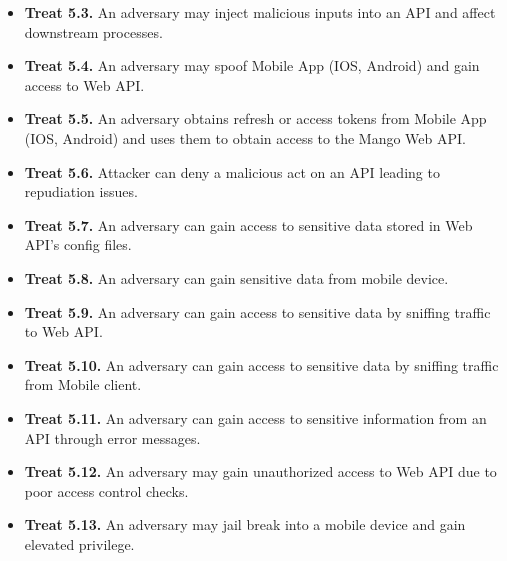 \begin{enumerate}
\begin{itemize}
        \item \textbf{Treat 5.3.} An adversary may inject malicious inputs into an API and affect downstream processes.
        \item \textbf{Treat 5.4.} An adversary may spoof Mobile App (IOS, Android) and gain access to Web API\@.
        \item \textbf{Treat 5.5.} An adversary obtains refresh or access tokens from Mobile App (IOS, Android) and uses them to
        obtain access to the Mango Web API\@.
        \item \textbf{Treat 5.6.} Attacker can deny a malicious act on an API leading to repudiation issues.
        \item \textbf{Treat 5.7.} An adversary can gain access to sensitive data stored in Web API's config files.
        \item \textbf{Treat 5.8.} An adversary can gain sensitive data from mobile device.
        \item \textbf{Treat 5.9.} An adversary can gain access to sensitive data by sniffing traffic to Web API\@.
        \item \textbf{Treat 5.10.} An adversary can gain access to sensitive data by sniffing traffic from Mobile client.
        \item \textbf{Treat 5.11.} An adversary can gain access to sensitive information from an API through error messages.
        \item \textbf{Treat 5.12.} An adversary may gain unauthorized access to Web API due to poor access control checks.
        \item \textbf{Treat 5.13.} An adversary may jail break into a mobile device and gain elevated privilege.
    \end{itemize}
\end{enumerate}